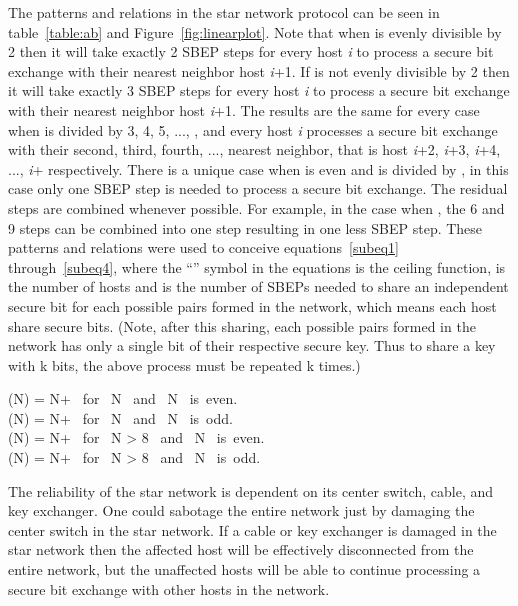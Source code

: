 \documentclass[a4paper,12pt,pdftex]{article}
\begin{document}
The patterns and relations in the star network protocol can be seen in table~\ref{table:ab} and Figure~\ref{fig:linearplot}. Note that when  is evenly divisible by 2 then it will take exactly 2 SBEP steps for every host \textit{i} to process a secure bit exchange with their nearest neighbor host \textit{i}+1. If  is not evenly divisible by 2 then it will take exactly 3 SBEP steps for every host \textit{i} to process a secure bit exchange with their nearest neighbor host \textit{i}+1. The results are the same for every case when  is divided by 3, 4, 5, ..., , and every host \textit{i} processes a secure bit exchange with their second, third, fourth, ...,  nearest neighbor, that is host \textit{i}+2, \textit{i}+3, \textit{i}+4, ..., \textit{i}+ respectively. There is a unique case when  is even and is divided by , in this case only one SBEP step is needed to process a secure bit exchange. The residual steps are combined whenever possible. For example, in the case when , the 6 and 9 steps can be combined into one step resulting in one less SBEP step. These patterns and relations were used to conceive equations~\eqref{subeq1} through~\eqref{subeq4}, where the ``'' symbol in the equations is the ceiling function,  is the number of hosts and  is the number of SBEPs needed to share an independent secure bit for each possible pairs formed in the network, which means each host share  secure bits. (Note, after this sharing, each possible pairs formed in the network has only a single bit of their respective secure key. Thus to share a key with k bits, the above process must be repeated k times.)


  (N) = N+  \left{}\right{} \mbox{    for } N  \mbox{ and } N \mbox{ is even}. \label{subeq1} \\
  (N) = N+  \left{}\right{} \mbox{    for } N  \mbox{ and } N \mbox{ is odd}. \label{subeq2} \\
  (N) = N+  \left{}\right{}  \mbox{    for } N > 8 \mbox{ and } N \mbox{ is even}. \label{subeq3} \\
  (N) = N+  \left{}\right\rceil  \mbox{    for } N > 8 \mbox{ and } N \mbox { is odd}. \label{subeq4}
 


The reliability of the star network is dependent on its center switch, cable, and key exchanger. One could sabotage the entire network just by damaging the center switch in the star network. If a cable or key exchanger is damaged in the star network then the affected host will be effectively disconnected from the entire network, but the unaffected hosts will be able to continue processing a secure bit exchange with other hosts in the network. 
\end{document}
